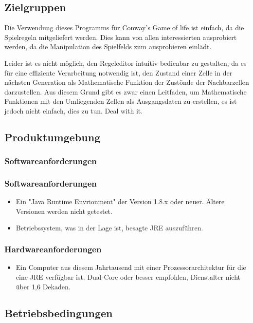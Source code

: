 \documentclass[11pt,a4paper]{article}
\begin{document}
\subsection{Zielgruppen}
Die Verwendung dieses Programms für Conway's Game of life ist einfach, da die Spielregeln mitgeliefert werden. Dies kann von allen interessierten ausprobiert werden, da die Manipulation des Spielfelds zum ausprobieren einlädt.

Leider ist es nicht möglich, den Regeleditor intuitiv bedienbar zu gestalten, da es für eine effiziente Verarbeitung notwendig ist, den Zustand einer Zelle in der nächsten Generation als Mathematische Funktion der Zustönde der Nachbarzellen darzustellen. Aus diesem Grund gibt es zwar einen Leitfaden, um Mathematische Funktionen mit den Umliegenden Zellen als Ausgangsdaten zu erstellen, es ist jedoch nicht einfach, dies zu tun. Deal with it.
\subsection{Produktumgebung}
\subsubsection{Softwareanforderungen}

\subsubsection{Softwareanforderungen}
\begin{itemize}
    \item Ein "Java Runtime Envrionment" der Version 1.8.x oder neuer. Ältere Versionen werden nicht getestet.
    \item Betriebssystem, was in der Lage ist, besagte JRE auszuführen. 
\end{itemize}

\subsubsection{Hardwareanforderungen}


\begin{itemize}
    \item Ein Computer aus diesem Jahrtausend mit einer Prozessorarchitektur für die eine JRE verfügbar ist. Dual-Core oder besser empfohlen, Dienstalter nicht über 1,6 Dekaden.
\end{itemize}


\subsection{Betriebsbedingungen}
\end{document}
